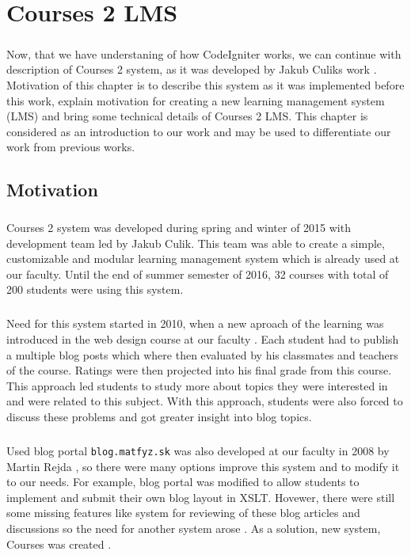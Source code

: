\chapter{Courses 2 LMS}


\paragraph{}
Now, that we have understaning of how CodeIgniter works, we can continue with description of Courses 2 system, as it was developed by Jakub Culiks work \cite{culik}. Motivation of this chapter is to describe this system as it was implemented before this work, explain motivation for creating a new learning management system (LMS) and bring some technical details of Courses 2 LMS. This chapter is considered as an introduction to our work and may be used to differentiate our work from previous works.

\section{Motivation}
\paragraph{}
Courses 2 system was developed during spring and winter of 2015 with development team led by Jakub Culik. This team was able to create a simple, customizable and modular learning management system which is already used at our faculty. Until the end of summer semester of 2016, 32 courses with total of 200 students were using this system.

\paragraph{}
Need for this system started in 2010, when a new aproach of the learning was introduced in the web design course at our faculty \cite{culik}. Each student had to publish a multiple blog posts which where then evaluated by his classmates and teachers of the course. Ratings were then projected into his final grade from this course. This approach led students to study more about topics they were interested in and were related to this subject. With this approach, students were also forced to discuss these problems and got greater insight into blog topics.

\paragraph{}
Used blog portal \texttt{blog.matfyz.sk} was also developed at our faculty in 2008 by Martin Rejda \cite{rejda}, so there were many options improve this system and to modify it to our needs. For example, blog portal was modified to allow students to implement and submit their own blog layout in XSLT. Hovewer, there were still some missing features like system for reviewing of these blog articles and discussions so the need for another system arose \cite{culik}. As a solution, new system, Courses was created \cite{culikbc}.


